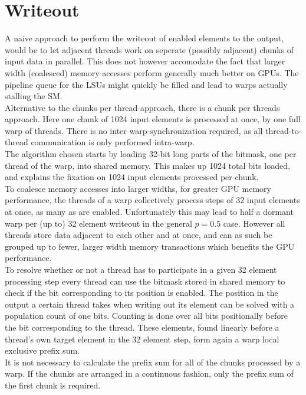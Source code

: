 \documentclass{tudscrreprt}
\begin{document}
		\section{Writeout}
			\label{sec:analysis_writeout}
			A naive approach to perform the writeout of enabled elements to the output, would be to let adjacent threads work on seperate (possibly adjacent) chunks of input data in parallel. This does not however accomodate the fact that larger width (coalesced) memory accesses perform generally much better on GPUs. The pipeline queue for the LSUs might quickly be filled and lead to warps actually stalling the SM. \\
			
			Alternative to the chunks per thread approach, there is a chunk per threads approach. Here one chunk of 1024 input elements is processed at once, by one full warp of threads. There is no inter warp-synchronization required, as all thread-to-thread communication is only performed intra-warp. \\
			The algorithm chosen starts by loading 32-bit long parts of the bitmask, one per thread of the warp, into shared memory. This makes up 1024 total bits loaded, and explains the fixation on 1024 input elements processed per chunk. \\
			To coalesce memory accesses into larger widths, for greater GPU memory performance, the threads of a warp collectively process steps of 32 input elements at once, as many as are enabled. Unfortunately this may lead to half a dormant warp per (up to) 32 element writeout in the general $p=0.5$ case. However all threads store data adjacent to each other and at once, and can as such be grouped up to fewer, larger width memory transactions which benefits the GPU performance. \\
			To resolve whether or not a thread has to participate in a given 32 element processing step every thread can use the bitmask stored in shared memory to check if the bit corresponding to its position is enabled. The position in the output a certain thread takes when writing out its element can be solved with a population count of one bits. Counting is done over all bits positionally before the bit corresponding to the thread. These elements, found linearly before a thread's own target element in the 32 element step, form again a warp local exclusive prefix sum. \\
			It is not necessary to calculate the prefix sum for all of the chunks processed by a warp. If the chunks are arranged in a continuous fashion, only the prefix sum of the first chunk is required. \\
			
\end{document}
